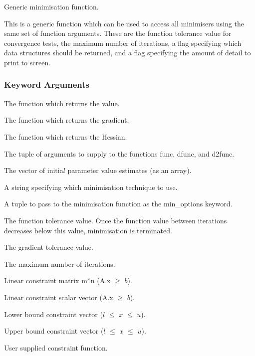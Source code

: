 Generic minimisation function.


This is a generic function which can be used to access all minimisers using the same set of function arguments.  These are the function tolerance value for convergence tests, the maximum number of iterations, a flag specifying which data structures should be returned, and a flag specifying the amount of detail to print to screen.



\subsubsection{Keyword Arguments}

  The function which returns the value. 

  The function which returns the gradient. 

  The function which returns the Hessian. 

  The tuple of arguments to supply to the functions func, dfunc, and d2func. 

  The vector of initia$l$ parameter value estimates (as an array). 

  A string specifying which minimisation technique to use. 

  A tuple to pass to the minimisation function as the min\_options keyword. 

  The function tolerance value.  Once the function value between iterations decreases below this value, minimisation is terminated. 

  The gradient tolerance value. 

  The maximum number of iterations. 

  Linear constraint matrix m*n (A.x $\ge$ $b$). 

  Linear constraint scalar vector (A.x $\ge$ $b$). 

  Lower bound constraint vector ($l$ $\le$ $x$ $\le$ $u$). 

  Upper bound constraint vector ($l$ $\le$ $x$ $\le$ $u$). 

  User supplied constraint function. 

